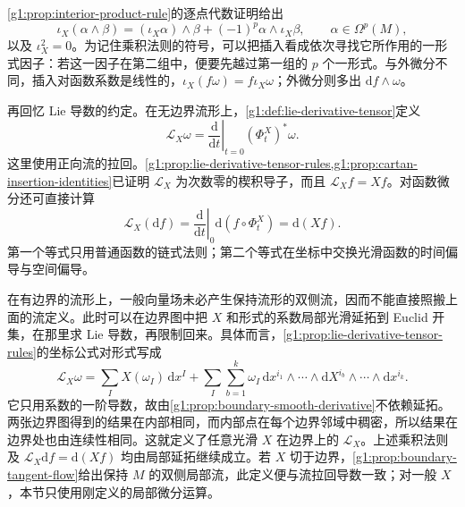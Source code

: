 \ProseParagraphBreak

\cref{g1:prop:interior-product-rule}的逐点代数证明给出
\[
	\iota_X(\alpha\wedge\beta)=(\iota_X\alpha)\wedge\beta+(-1)^p\alpha\wedge\iota_X\beta,
	\qquad \alpha\in\Omega^p(M),
\]
以及 \(\iota_X^2=0\)。为记住乘积法则的符号，可以把插入看成依次寻找它所作用的一形式因子：若这一因子在第二组中，便要先越过第一组的 \(p\) 个一形式。与外微分不同，插入对函数系数是线性的，\(\iota_X(f\omega)=f\iota_X\omega\)；外微分则多出 \(\mathrm{d}f\wedge\omega\)。

\ProseParagraphBreak

再回忆 Lie 导数的约定。在无边界流形上，\cref{g1:def:lie-derivative-tensor}定义
\[
	\mathcal L_X\omega=\left.\frac{\mathrm{d}}{\mathrm{d}t}\right|_{t=0}(\Phi_t^X)^*\omega.
\]
这里使用正向流的拉回。\cref{g1:prop:lie-derivative-tensor-rules,g1:prop:cartan-insertion-identities}已证明 \(\mathcal L_X\) 为次数零的楔积导子，而且 \(\mathcal L_Xf=Xf\)。对函数微分还可直接计算
\[
	\mathcal L_X(\mathrm{d}f)
	=\left.\frac{\mathrm{d}}{\mathrm{d}t}\right|_{0}\mathrm{d}(f\circ\Phi_t^X)
	=\mathrm{d}(Xf).
\]
第一个等式只用普通函数的链式法则；第二个等式在坐标中交换光滑函数的时间偏导与空间偏导。

\ProseParagraphBreak

在有边界的流形上，一般向量场未必产生保持流形的双侧流，因而不能直接照搬上面的流定义。此时可以在边界图中把 \(X\) 和形式的系数局部光滑延拓到 Euclid 开集，在那里求 Lie 导数，再限制回来。具体而言，\cref{g1:prop:lie-derivative-tensor-rules}的坐标公式对形式写成
\begin{equation}
	\label{g1:eq:boundary-form-lie-derivative}
	\mathcal L_X\omega
	=\sum_I X(\omega_I)\,\mathrm{d}x^I
	+\sum_I\sum_{b=1}^k\omega_I\,\mathrm{d}x^{i_1}\wedge\cdots\wedge\mathrm{d}X^{i_b}\wedge\cdots\wedge\mathrm{d}x^{i_k}.
\end{equation}
它只用系数的一阶导数，故由\cref{g1:prop:boundary-smooth-derivative}不依赖延拓。两张边界图得到的结果在内部相同，而内部点在每个边界邻域中稠密，所以结果在边界处也由连续性相同。这就定义了任意光滑 \(X\) 在边界上的 \(\mathcal L_X\)。上述乘积法则及 \(\mathcal L_X\mathrm{d}f=\mathrm{d}(Xf)\) 均由局部延拓继续成立。若 \(X\) 切于边界，\cref{g1:prop:boundary-tangent-flow}给出保持 \(M\) 的双侧局部流，此定义便与流拉回导数一致；对一般 \(X\)，本节只使用刚定义的局部微分运算。

